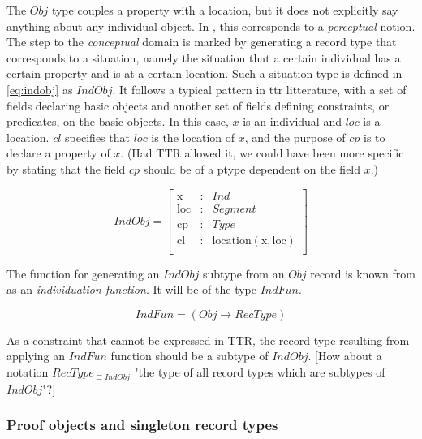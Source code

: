\documentclass[11pt, a4paper]{article}
\begin{document}
The $Obj$ type couples a property with a location, but it does not explicitly say anything about any individual object.
In \cite{lspc}, this corresponds to a \textit{perceptual} notion.
The step to the \textit{conceptual} domain is marked by generating a record type that corresponds to a situation, namely the situation that a certain individual has a certain property and is at a certain location.
Such a situation type is defined in \autoref{eq:indobj} as $IndObj$.
It follows a typical pattern in \gls{ttr} litterature, with a set of fields declaring basic objects and another set of fields defining constraints, or predicates, on the basic objects.
In this case, $x$ is an individual and $loc$ is a location.
$cl$ specifies that $loc$ is the location of $x$, and the purpose of $cp$ is to declare a property of $x$.
(Had TTR allowed it, we could have been more specific by stating that the field $cp$ should be of a ptype dependent on the field $x$.)

\begin{equation}\label{eq:indobj}
IndObj = \left[\begin{array}{rcl}
\text{x} &:& Ind \\
\text{loc} &:& Segment \\
\text{cp} &:& Type \\
\text{cl} &:& \text{location}(\text{x}, \text{loc}) \\
\end{array}\right]
\end{equation}

The function for generating an $IndObj$ subtype from an $Obj$ record is known from \cite{lspc} as an \textit{individuation function}.
It will be of the type $IndFun$.

\begin{equation}\label{eq:indfun}
IndFun = ( Obj \rightarrow RecType )
\end{equation}

As a constraint that cannot be expressed in TTR, the record type resulting from applying an $IndFun$ function should be a subtype of $IndObj$.
[How about a notation $RecType_{\sqsubseteq IndObj}$ "the type of all record types which are subtypes of $IndObj$"?]



\subsubsection{Proof objects and singleton record types}
\end{document}

